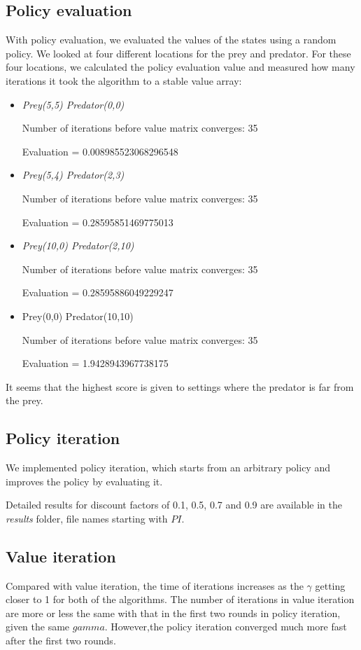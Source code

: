 \documentclass{article}
\begin{document}
\subsection{Policy evaluation}
With policy evaluation, we evaluated the values of the states using a random policy. We looked at four different locations for the prey and predator. For these four locations, we calculated the policy evaluation value and measured how many iterations it took the algorithm to a stable value array:

\begin{itemize}
\item \emph{Prey(5,5) Predator(0,0)}

Number of iterations before value matrix converges: 35

Evaluation = 0.008985523068296548

\item \emph{Prey(5,4) Predator(2,3)}

Number of iterations before value matrix converges: 35

Evaluation = 0.28595851469775013

\item \emph{Prey(10,0) Predator(2,10)}

Number of iterations before value matrix converges: 35

Evaluation = 0.28595886049229247

\item Prey(0,0) Predator(10,10)

Number of iterations before value matrix converges: 35

Evaluation = 1.9428943967738175
\end{itemize}

It seems that the highest score is given to settings where the predator is far from the prey.
\subsection{Policy iteration}
We implemented policy iteration, which starts from an arbitrary policy and improves the policy by evaluating it.

Detailed results for discount factors of 0.1, 0.5, 0.7 and 0.9 are available in the \emph{results} folder, file names starting with $PI$.
\subsection{Value iteration}
Compared with value iteration, the time of iterations increases as the $\gamma$ getting closer to 1 for both of the algorithms. The number of iterations in value iteration are more or less the same with that in the first two rounds in policy iteration, given the same $gamma$. However,the policy iteration converged much more fast after the first two rounds.
\end{document}

